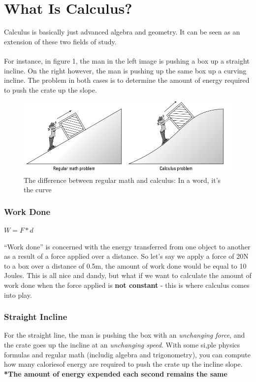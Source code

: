 \documentclass{article}
\begin{document}
\section{\LARGE What Is Calculus?}
\vspace*{5mm}
Calculus is basically just advanced algebra and geometry. It can be seen as an extension of these two fields of study.\\
\\
For instance, in figure 1, the man in the left image is pushing a box up a straight incline.
On the right however, the man is pushing up the same box up a curving incline. The problem in both cases is to determine the amount of energy required to push the crate up the slope.

\begin{figure}[h]
    \centering
    \includegraphics[width=1.1\textwidth]{figure-1-1.png}
    \caption{The difference between regular math and calculus: In a word, it’s the curve}
    \label{fig:01}
\end{figure}

\subsubsection*{\large Work Done}
\begin{center}
$W = F * d$

\end{center}
``Work done'' is concerned with the energy transferred from one object to another as a result of a force applied over a distance. So let's say we apply a force of 20N to a box over a distance of 0.5m, the amount of work done would be equal to 10 Joules.
This is all nice and dandy, but what if we want to calculate the amount of work done when the force applied is \textbf{not constant} - this is where calculus comes into play. 

\subsubsection*{\large Straight Incline}
For the straight line, the man is pushing the box with an \textit{unchanging force}, and the crate goes up the incline at an \textit{unchanging speed}. With some si,ple physics formulas and regular math (includig algebra and trigonometry), you can compute how many caloriesof energy are required to push the crate up the incline slope.\\
\textbf{*The amount of energy expended each second remains the same}
\end{document}
